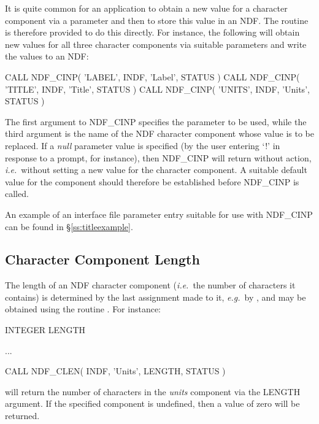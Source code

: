 \documentclass[twoside,11pt,nolof]{starlink}
\providecommand{\st}[1]{{\emph{#1}}}
\begin{document}
It is quite common for an application to obtain a new value for a
character component via a parameter and then to store this value in an
NDF.
The routine  is therefore provided to do this directly.  For
instance, the following will obtain new values for all three character
components via suitable parameters and write the values to an NDF:

\small
\begin{terminalv}
      CALL NDF_CINP( 'LABEL', INDF, 'Label', STATUS )
      CALL NDF_CINP( 'TITLE', INDF, 'Title', STATUS )
      CALL NDF_CINP( 'UNITS', INDF, 'Units', STATUS )
\end{terminalv}
\normalsize

The first argument to NDF\_CINP specifies the parameter to be used, while
the third argument is the name of the NDF character component whose value is to
be replaced.
If a \st{null\/} parameter value is specified (by the user entering `!' in
response to a prompt, for instance), then NDF\_CINP will return without
action, \st{i.e.}\ without setting a new value for the character component.
A suitable default value for the component should therefore be established
before NDF\_CINP is called.

An example of an  interface file parameter entry
suitable for use with
NDF\_CINP can be found in \S\ref{ss:titleexample}.

\subsection{Character Component Length}

The length of an NDF character component (\st{i.e.}\ the number of
characters it contains) is determined by the last assignment made to it,
\st{e.g.}\ by , and may be obtained using the routine .
For instance:

\small
\begin{terminalv}
      INTEGER LENGTH

      ...

      CALL NDF_CLEN( INDF, 'Units', LENGTH, STATUS )
\end{terminalv}
\normalsize

will return the number of characters in the \st{units\/} component via the
LENGTH argument.
If the specified component is undefined, then a value of zero will be
returned.
\end{document}
